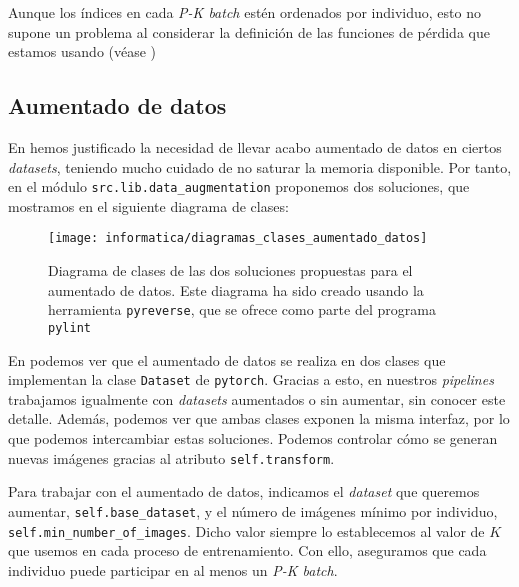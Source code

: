 \begin{observacion}

    Aunque los índices en cada \textit{P-K batch} estén ordenados por individuo, esto no supone un problema al considerar la definición de las funciones de pérdida que estamos usando (véase )

\end{observacion}

\subsection{Aumentado de datos} \label{isec:aumentado_datos}

En  hemos justificado la necesidad de llevar acabo aumentado de datos en ciertos \textit{datasets}, teniendo mucho cuidado de no saturar la memoria disponible. Por tanto, en el módulo \lstinline{src.lib.data_augmentation} proponemos dos soluciones, que mostramos en el siguiente diagrama de clases:

\begin{figure}[H]
    \centering
    \texttt{[image: informatica/diagramas\_clases\_aumentado\_datos]}
    \caption{Diagrama de clases de las dos soluciones propuestas para el aumentado de datos. Este diagrama ha sido creado usando la herramienta \lstinline{pyreverse}, que se ofrece como parte del programa \lstinline{pylint}}
    \label{img:diagrama_clases_aumentado_datos}
\end{figure}

En  podemos ver que el aumentado de datos se realiza en dos clases que implementan la clase \lstinline{Dataset} de \lstinline{pytorch}. Gracias a esto, en nuestros \textit{pipelines} trabajamos igualmente con \textit{datasets} aumentados o sin aumentar, sin conocer este detalle. Además, podemos ver que ambas clases exponen la misma interfaz, por lo que podemos intercambiar estas soluciones. Podemos controlar cómo se generan nuevas imágenes gracias al atributo \lstinline{self.transform}.

Para trabajar con el aumentado de datos, indicamos el \textit{dataset} que queremos aumentar, \lstinline{self.base_dataset}, y el número de imágenes mínimo por individuo, \lstinline{self.min_number_of_images}. Dicho valor siempre lo establecemos al valor de $K$ que usemos en cada proceso de entrenamiento. Con ello, aseguramos que cada individuo puede participar en al menos un \textit{P-K batch}.

